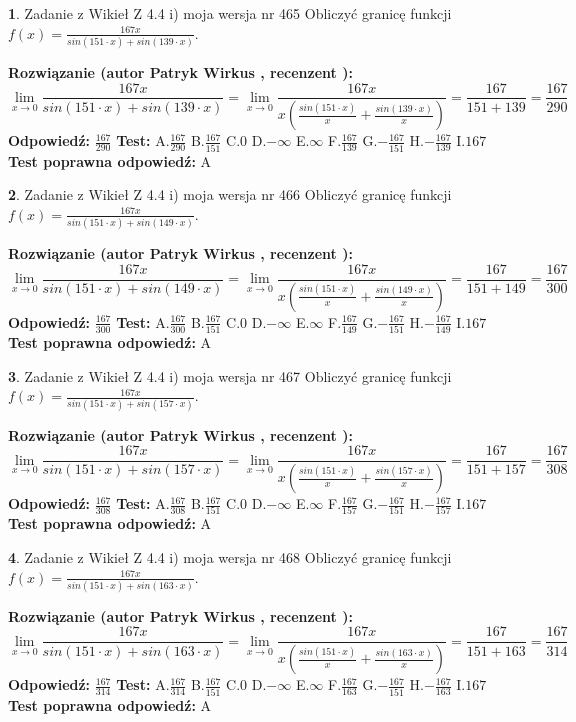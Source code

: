 \documentclass[12pt, a4paper]{article}
\theoremstyle{definition} %
\newtheorem{zad}{}
\newcommand{\zadStart}[1]{\begin{zad}#1\newline}
\newcommand{\zadStop}{\end{zad}}
\newcommand{\rozwStart}[2]{\noindent \textbf{Rozwiązanie (autor #1 , recenzent #2): }\newline}
\newcommand{\rozwStop}{\newline}
\newcommand{\odpStart}{\noindent \textbf{Odpowiedź:}\newline}
\newcommand{\odpStop}{\newline}
\newcommand{\testStart}{\noindent \textbf{Test:}\newline}
\newcommand{\testStop}{\newline}
\newcommand{\kluczStart}{\noindent \textbf{Test poprawna odpowiedź:}\newline}
\newcommand{\kluczStop}{\newline}
\begin{document}
\zadStart{Zadanie z Wikieł Z 4.4 i) moja wersja nr 465}
Obliczyć granicę funkcji $f(x)=\frac{167x}{sin(151\cdot x) +sin(139\cdot x)}$.
\zadStop
\rozwStart{Patryk Wirkus}{}
$$\lim\limits_{x\to 0}\frac{167x}{sin(151\cdot x) +sin(139\cdot x)}=\lim\limits_{x\to 0}\frac{167x}{x(\frac{sin(151\cdot x)}{x}+\frac{sin(139\cdot x)}{x})}=\frac{167}{151+139} = \frac{167}{290}$$
\rozwStop
\odpStart
$\frac{167}{290}$
\odpStop
\testStart
A.$\frac{167}{290}$
B.$\frac{167}{151}$
C.$0$
D.$-\infty$
E.$\infty$
F.$\frac{167}{139}$
G.$-\frac{167}{151}$
H.$-\frac{167}{139}$
I.$167$
\testStop
\kluczStart
A
\kluczStop



\zadStart{Zadanie z Wikieł Z 4.4 i) moja wersja nr 466}
Obliczyć granicę funkcji $f(x)=\frac{167x}{sin(151\cdot x) +sin(149\cdot x)}$.
\zadStop
\rozwStart{Patryk Wirkus}{}
$$\lim\limits_{x\to 0}\frac{167x}{sin(151\cdot x) +sin(149\cdot x)}=\lim\limits_{x\to 0}\frac{167x}{x(\frac{sin(151\cdot x)}{x}+\frac{sin(149\cdot x)}{x})}=\frac{167}{151+149} = \frac{167}{300}$$
\rozwStop
\odpStart
$\frac{167}{300}$
\odpStop
\testStart
A.$\frac{167}{300}$
B.$\frac{167}{151}$
C.$0$
D.$-\infty$
E.$\infty$
F.$\frac{167}{149}$
G.$-\frac{167}{151}$
H.$-\frac{167}{149}$
I.$167$
\testStop
\kluczStart
A
\kluczStop



\zadStart{Zadanie z Wikieł Z 4.4 i) moja wersja nr 467}
Obliczyć granicę funkcji $f(x)=\frac{167x}{sin(151\cdot x) +sin(157\cdot x)}$.
\zadStop
\rozwStart{Patryk Wirkus}{}
$$\lim\limits_{x\to 0}\frac{167x}{sin(151\cdot x) +sin(157\cdot x)}=\lim\limits_{x\to 0}\frac{167x}{x(\frac{sin(151\cdot x)}{x}+\frac{sin(157\cdot x)}{x})}=\frac{167}{151+157} = \frac{167}{308}$$
\rozwStop
\odpStart
$\frac{167}{308}$
\odpStop
\testStart
A.$\frac{167}{308}$
B.$\frac{167}{151}$
C.$0$
D.$-\infty$
E.$\infty$
F.$\frac{167}{157}$
G.$-\frac{167}{151}$
H.$-\frac{167}{157}$
I.$167$
\testStop
\kluczStart
A
\kluczStop



\zadStart{Zadanie z Wikieł Z 4.4 i) moja wersja nr 468}
Obliczyć granicę funkcji $f(x)=\frac{167x}{sin(151\cdot x) +sin(163\cdot x)}$.
\zadStop
\rozwStart{Patryk Wirkus}{}
$$\lim\limits_{x\to 0}\frac{167x}{sin(151\cdot x) +sin(163\cdot x)}=\lim\limits_{x\to 0}\frac{167x}{x(\frac{sin(151\cdot x)}{x}+\frac{sin(163\cdot x)}{x})}=\frac{167}{151+163} = \frac{167}{314}$$
\rozwStop
\odpStart
$\frac{167}{314}$
\odpStop
\testStart
A.$\frac{167}{314}$
B.$\frac{167}{151}$
C.$0$
D.$-\infty$
E.$\infty$
F.$\frac{167}{163}$
G.$-\frac{167}{151}$
H.$-\frac{167}{163}$
I.$167$
\testStop
\kluczStart
A
\kluczStop
\end{document}
